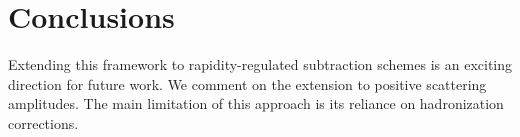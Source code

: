\section{Conclusions}\label{sec:conclusions}

Extending this framework to rapidity-regulated subtraction schemes is an
exciting direction for future work. We comment on the extension to
positive scattering amplitudes. The main limitation of this approach is
its reliance on hadronization corrections.

